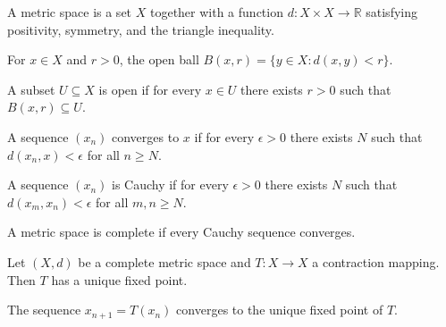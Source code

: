 
\begin{definition}\label{def:metric}
A metric space is a set $X$ together with a function $d: X \times X \to \mathbb{R}$ satisfying
positivity, symmetry, and the triangle inequality.
\end{definition}

\begin{definition}\label{def:open-ball}
For $x \in X$ and $r > 0$, the open ball $B(x,r) = \{y \in X : d(x,y) < r\}$.
\end{definition}

\begin{definition}\label{def:open-set}
A subset $U \subseteq X$ is open if for every $x \in U$ there exists $r > 0$ such that $B(x,r) \subseteq U$.
\end{definition}

\begin{definition}\label{def:convergent}
A sequence $(x_n)$ converges to $x$ if for every $\epsilon > 0$ there exists $N$ such that $d(x_n, x) < \epsilon$ for all $n \geq N$.
\end{definition}

\begin{definition}\label{def:cauchy}
A sequence $(x_n)$ is Cauchy if for every $\epsilon > 0$ there exists $N$ such that $d(x_m, x_n) < \epsilon$ for all $m, n \geq N$.
\end{definition}

\begin{definition}\label{def:complete}
A metric space is complete if every Cauchy sequence converges.
\end{definition}

\begin{theorem}\label{thm:banach}
Let $(X, d)$ be a complete metric space and $T: X \to X$ a contraction mapping. Then $T$ has a unique fixed point.
\end{theorem}

\begin{corollary}\label{cor:picard}
The sequence $x_{n+1} = T(x_n)$ converges to the unique fixed point of $T$.
\end{corollary}

